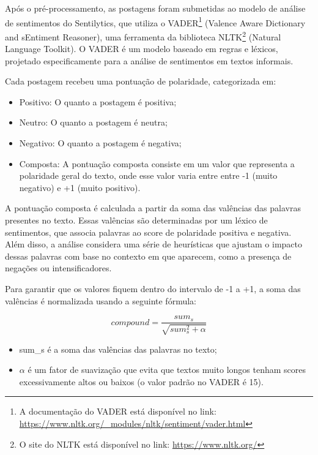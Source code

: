 \documentclass[
	12pt,				%
	oneside,			%
	a4paper,			%
	english,			%
	french,				%
	spanish,			%
	brazil				%
	]{abntex2}
\begin{document}
Após o pré-processamento, as postagens foram submetidas ao modelo de
análise de sentimentos do Sentilytics, que utiliza o VADER\footnote{A
  documentação do VADER está disponível no link:
  \url{https://www.nltk.org/_modules/nltk/sentiment/vader.html}}
(Valence Aware Dictionary and sEntiment Reasoner), uma ferramenta da
biblioteca NLTK\footnote{O site do NLTK está disponível no link:
  \url{https://www.nltk.org/}} (Natural Language Toolkit). O VADER é um
modelo baseado em regras e léxicos, projetado especificamente para a
análise de sentimentos em textos informais.

Cada postagem recebeu uma pontuação de polaridade, categorizada em:

\begin{itemize}
\tightlist
\item
  Positivo: O quanto a postagem é positiva;
\item
  Neutro: O quanto a postagem é neutra;
\item
  Negativo: O quanto a postagem é negativa;
\item
  Composta: A pontuação composta consiste em um valor que representa a
  polaridade geral do texto, onde esse valor varia entre entre -1 (muito
  negativo) e +1 (muito positivo).
\end{itemize}

A pontuação composta é calculada a partir da soma das valências das
palavras presentes no texto. Essas valências são determinadas por um
léxico de sentimentos, que associa palavras ao score de polaridade
positiva e negativa. Além disso, a análise considera uma série de
heurísticas que ajustam o impacto dessas palavras com base no contexto
em que aparecem, como a presença de negações ou intensificadores.

Para garantir que os valores fiquem dentro do intervalo de -1 a +1, a
soma das valências é normalizada usando a seguinte fórmula:

\begin{equation}
    compound = \frac{sum_s}{\sqrt{sum_s^2 + \alpha}}
\end{equation}

\begin{itemize}
\tightlist
\item
  sum\_s é a soma das valências das palavras no texto;
\item
  \(\alpha\) é um fator de suavização que evita que textos muito longos
  tenham scores excessivamente altos ou baixos (o valor padrão no VADER
  é 15).
\end{itemize}
\end{document}
